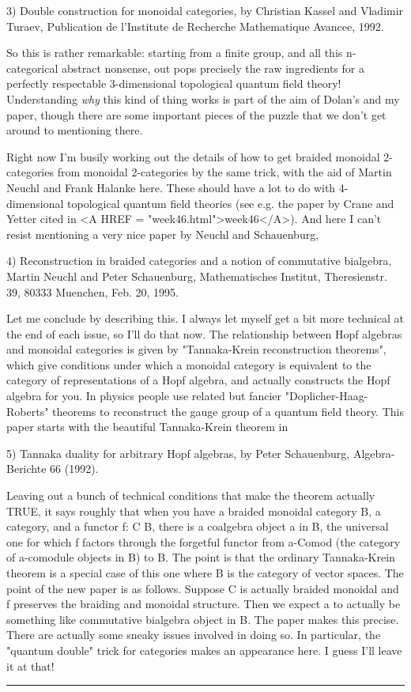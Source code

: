3) Double construction for monoidal categories, by Christian Kassel and
Vladimir Turaev, Publication de l'Institute de Recherche Mathematique
Avancee, 1992.

So this is rather remarkable: starting from a finite group, and
all this n-categorical abstract nonsense, out pops precisely the raw
ingredients for a perfectly respectable 3-dimensional topological
quantum field theory!  Understanding \emph{why} this kind of thing works
is part of the aim of Dolan's and my paper, though there are some
important pieces of the puzzle that we don't get around to mentioning
there.

Right now I'm busily working out the details of how to get braided
monoidal 2-categories from monoidal 2-categories by the same trick,
with the aid of Martin Neuchl and Frank Halanke here.  These should
have a lot to do with 4-dimensional topological quantum field theories
(see e.g. the paper by Crane and Yetter cited in <A HREF = "week46.html">week46</A>).  And here I
can't resist mentioning a very nice paper by Neuchl and Schauenburg,

4) Reconstruction in braided categories and a notion of commutative
bialgebra, Martin Neuchl and Peter Schauenburg, Mathematisches
Institut, Theresienstr. 39, 80333 Muenchen, Feb. 20, 1995.

Let me conclude by describing this.  I always let myself get a bit
more technical at the end of each issue, so I'll do that now.
The relationship between Hopf algebras and monoidal categories is
given by "Tannaka-Krein reconstruction theorems", which give conditions under
which a monoidal category is equivalent to the category of representations
of a Hopf algebra, and actually constructs the Hopf algebra for you.
In physics people use related but fancier "Doplicher-Haag-Roberts"
theorems to reconstruct the gauge group of a quantum field theory.
This paper starts with the beautiful Tannaka-Krein theorem in

5) Tannaka duality for arbitrary Hopf algebras, by Peter Schauenburg,
Algebra-Berichte 66 (1992).

Leaving out a bunch of technical conditions that make the theorem
actually TRUE, it says roughly that when you have a braided monoidal
category B, a category, and a functor f: C \to  B, there is a coalgebra
object a in B, the universal one for which f factors through the forgetful
functor from a-Comod (the category of a-comodule objects in B) to B.
The point is that the ordinary Tannaka-Krein theorem is a special
case of this one where B is the category of vector spaces.  The point
of the new paper is as follows.  Suppose C is actually braided monoidal and
f preserves the braiding and monoidal structure.  Then we expect a to 
actually be something like commutative bialgebra object in B.  The
paper makes this precise.  There are actually some sneaky issues involved
in doing so.  In particular, the "quantum double" trick for categories
makes an appearance here.  I guess I'll leave it at that!
\par\noindent\rule{\textwidth}{0.4pt}

